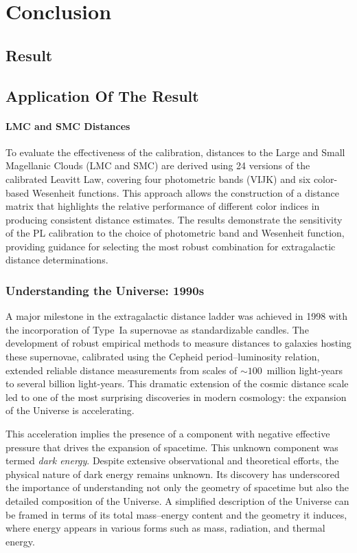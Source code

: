 \chapter{Conclusion}

\section{Result}


\section{Application Of The Result}
\subsubsection*{LMC and SMC Distances}
To evaluate the effectiveness of the calibration, distances to the Large and Small Magellanic Clouds (LMC and SMC) are derived using 24 versions of the calibrated Leavitt Law, covering four photometric bands (VIJK) and six color-based Wesenheit functions. This approach allows the construction of a distance matrix that highlights the relative performance of different color indices in producing consistent distance estimates. The results demonstrate the sensitivity of the PL calibration to the choice of photometric band and Wesenheit function, providing guidance for selecting the most robust combination for extragalactic distance determinations.



\subsection{Understanding the Universe: 1990s}

A major milestone in the extragalactic distance ladder was achieved in 1998 with the incorporation of Type~Ia supernovae as standardizable candles. The development of robust empirical methods to measure distances to galaxies hosting these supernovae, calibrated using the Cepheid period--luminosity relation, extended reliable distance measurements from scales of $\sim 100$~million light-years to several billion light-years. This dramatic extension of the cosmic distance scale led to one of the most surprising discoveries in modern cosmology: the expansion of the Universe is accelerating.

This acceleration implies the presence of a component with negative effective pressure that drives the expansion of spacetime. This unknown component was termed \emph{dark energy}. Despite extensive observational and theoretical efforts, the physical nature of dark energy remains unknown. Its discovery has underscored the importance of understanding not only the geometry of spacetime but also the detailed composition of the Universe. A simplified description of the Universe can be framed in terms of its total mass--energy content and the geometry it induces, where energy appears in various forms such as mass, radiation, and thermal energy.

